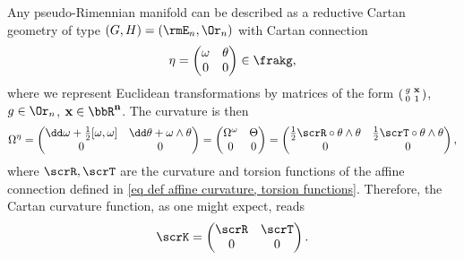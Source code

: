 \begin{example}\label{ex Riemannian cartan geom}
    Any pseudo-Rimennian manifold can be described as a reductive Cartan geometry of type $(G,H)=(\rmE_n,\Or_n)$ with Cartan connection 
    \[\eta=\begin{pmatrix}
        \omega & \theta\\
        0 & 0
    \end{pmatrix}\in \frakg,\]
    where we represent Euclidean transformations by matrices of the form $\left(\begin{smallmatrix}
        g & \bf{x}\\
        0 & 1
    \end{smallmatrix}\right)$, $g\in\Or_n$, $\bf{x}\in\bbR^n$. The curvature is then 
    \[\Omega^\eta=\begin{pmatrix}
        \dd\omega+\frac12[\omega,\omega] & \dd\theta+\omega\wedge\theta\\
        0 & 0
    \end{pmatrix}=\begin{pmatrix}
        \Omega^\omega & \Theta\\
        0 & 0
    \end{pmatrix}=\begin{pmatrix}
        \frac12 \scrR\circ \theta\wedge\theta & \frac12\scrT\circ \theta\wedge\theta\\
        0 & 0
    \end{pmatrix},\]
    where $\scrR, \scrT$ are the curvature and torsion functions of the affine connection defined in \eqref{eq def affine curvature, torsion functions}. Therefore, the Cartan curvature function, as one might expect, reads
    \[\scrK=\begin{pmatrix}
        \scrR & \scrT\\
        0 & 0
    \end{pmatrix}.\]
\end{example}


